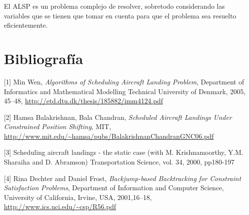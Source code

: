 \documentclass[letter, 11pt]{article}
\begin{document}
El ALSP es un problema complejo de resolver, sobretodo considerando las variables que se tienen que tomar en cuenta para que el problema sea resuelto eficientemente. 

\section{Bibliograf\'ia}

[1] Min Wen, \textit{Algorithms of Scheduling Aircraft Landing Problem}, Department of Informatics and Mathematical Modelling Technical University of Denmark, 2005, 45--48, \url{http://etd.dtu.dk/thesis/185882/imm4124.pdf}

[2] Hamsa Balakrishnan, Bala Chandran, \textit{Scheduled Aircraft Landings Under Constrained Position Shifting}, MIT, \url{http://www.mit.edu/~hamsa/pubs/BalakrishnanChandranGNC06.pdf}

[3] Scheduling aircraft landings - the static case (with M. Krishnamoorthy, Y.M. Sharaiha and D. Abramson) Transportation Science, vol. 34, 2000, pp180-197

[4] Rina Dechter and Daniel Frost, \textit{Backjump-based Backtracking for Constraint Satisfaction Problems}, Department of Information and Computer Science, University of California, Irvine, USA, 2001,16--18, \url{http://www.ics.uci.edu/~csp/R56.pdf}
\end{document}
